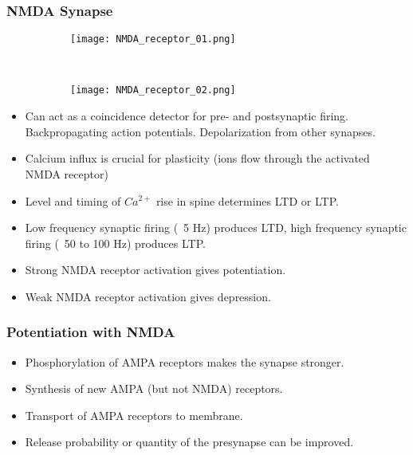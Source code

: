 \documentclass[main]{subfiles}
\begin{document}
\subsubsection{NMDA Synapse}
\begin{figure}[H]
	\centering
	\begin{subfigure}[b]{0.5\textwidth}
    	\centering
		\texttt{[image: NMDA\_receptor\_01.png]}
	\end{subfigure}%
	~
	\begin{subfigure}[b]{0.5\textwidth}
		\centering
		\texttt{[image: NMDA\_receptor\_02.png]}
	\end{subfigure}
\end{figure}
\begin{itemize}[noitemsep,nolistsep]
	\item Can act as a coincidence detector for pre- and postsynaptic firing.
	\subitem Backpropagating action potentials.
	\subitem Depolarization from other synapses.
	\item Calcium influx is crucial for plasticity (ions flow through the activated NMDA receptor)
	\item Level and timing of $Ca^{2+}$ rise in spine determines LTD or LTP.
	\item Low frequency synaptic firing (~5 Hz) produces LTD, high frequency synaptic firing (~50 to 100 Hz) produces LTP.
	\item Strong NMDA receptor activation gives potentiation.
	\item Weak NMDA receptor activation gives depression.
\end{itemize}

\subsubsection{Potentiation with NMDA}
\begin{itemize}[noitemsep,nolistsep]
	\item Phosphorylation of AMPA receptors makes the synapse stronger.
	\item Synthesis of new AMPA (but not NMDA) receptors.
	\item Transport of AMPA receptors to membrane.
	\item Release probability or quantity of the presynapse can be improved.
\end{itemize}
\end{document}
